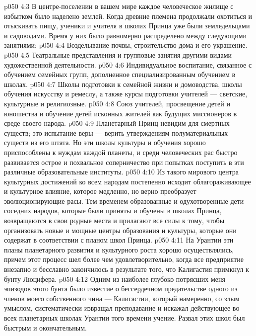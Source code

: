 \vs p050 4:3 \pc В центре\hyp{}поселении в вашем мире каждое человеческое жилище с избытком было наделено землей. Когда древние племена продолжали охотиться и отыскивать пищу, ученики и учителя в школах Принца уже были земледельцами и садоводами. Время у них было равномерно распределено между следующими занятиями:
\vs p050 4:4 \bibnobreakspace {} Возделывание почвы, строительство дома и его украшение.
\vs p050 4:5 \bibnobreakspace {} Театральные представления и групповые занятия другими видами художественной деятельности.
\vs p050 4:6 \bibnobreakspace {} Индивидуальное воспитание, связанное с обучением семейных групп, дополненное специализированным обучением в школах.
\vs p050 4:7 \bibnobreakspace {} Школы подготовки к семейной жизни и домоводства, школы обучения искусству и ремеслу, а также курсы подготовки учителей --- светские, культурные и религиозные.
\vs p050 4:8 \bibnobreakspace {} Союз учителей, просвещение детей и юношества и обучение детей исконных жителей как будущих миссионеров в среде своего народа.
\vs p050 4:9 \pc Планетарный Принц невидим для смертных существ; это испытание веры --- верить утверждениям полуматериальных существ из его штата. Но эти школы культуры и обучения хорошо приспособлены к нуждам каждой планеты, и среди человеческих рас быстро развивается острое и похвальное соперничество при попытках поступить в эти различные образовательные институты.
\vs p050 4:10 Из такого мирового центра культурных достижений ко всем народам постепенно исходит облагораживающее и культурное влияние, которое медленно, но верно преобразует эволюционирующие расы. Тем временем образованные и одухотворенные дети соседних народов, которые были приняты и обучены в школах Принца, возвращаются в свои родные места и прилагают все силы к тому, чтобы организовать новые и мощные центры образования и культуры, которые они содержат в соответствии с планом школ Принца.
\vs p050 4:11 \pc На Урантии эти планы планетарного развития и культурного роста хорошо осуществлялись, причем этот процесс шел более чем удовлетворительно, когда все предприятие внезапно и бесславно закончилось в результате того, что Калигастия примкнул к бунту Люцифера.
\vs p050 4:12 Одним из наиболее глубоко потрясших меня эпизодов этого бунта было известие о бессердечном предательстве одного из членов моего собственного чина --- Калигастии, который намеренно, со злым умыслом, систематически извращал преподавание и искажал действующее во всех планетарных школах Урантии того времени учение. Развал этих школ был быстрым и окончательным.
